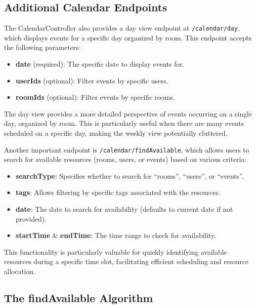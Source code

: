 \subsection{Additional Calendar Endpoints}\label{subsec:additional-calendar-endpoints}

The CalendarController also provides a day view endpoint at \texttt{/calendar/day}, which displays events for a specific day organized by room.
This endpoint accepts the following parameters:

\begin{itemize}
    \item \textbf{date} (required): The specific date to display events for.
    \item \textbf{userIds} (optional): Filter events by specific users.
    \item \textbf{roomIds} (optional): Filter events by specific rooms.
\end{itemize}

The day view provides a more detailed perspective of events occurring on a single day, organized by room.
This is particularly useful when there are many events scheduled on a specific day, making the weekly view potentially cluttered.

Another important endpoint is \texttt{/calendar/findAvailable}, which allows users to search for available resources (rooms, users, or events) based on various criteria:

\begin{itemize}
    \item \textbf{searchType}: Specifies whether to search for ``rooms'', ``users'', or ``events''.
    \item \textbf{tags}: Allows filtering by specific tags associated with the resources.
    \item \textbf{date}: The date to search for availability (defaults to current date if not provided).
    \item \textbf{startTime} \& \textbf{endTime}: The time range to check for availability.
\end{itemize}

This functionality is particularly valuable for quickly identifying available resources during a specific time slot, facilitating efficient scheduling and resource allocation.

\subsection{The findAvailable Algorithm}\label{subsec:findavailable-algorithm}

